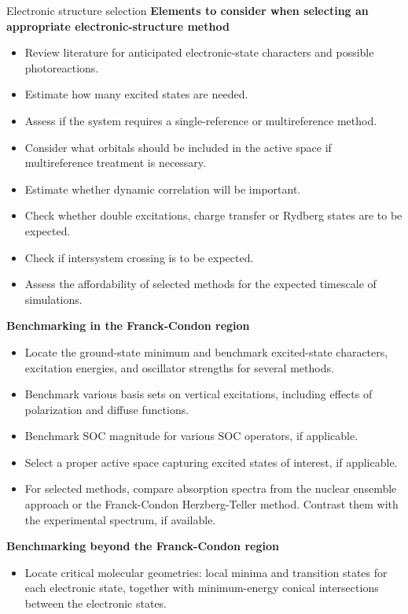 \documentclass[9pt,bestpractices]{livecoms}
\begin{document}
\begin{Checklists*}[p!]

\begin{checklist}{Electronic structure selection}
\textbf{Elements to consider when selecting an appropriate electronic-structure method}
\begin{itemize}
\item Review literature for anticipated electronic-state characters and possible photoreactions.
\item Estimate how many excited states are needed.
\item Assess if the system requires a single-reference or multireference method.
\item Consider what orbitals should be included in the active space if multireference treatment is necessary. 
\item Estimate whether dynamic correlation will be important.
\item Check whether double excitations, charge transfer or Rydberg states are to be expected.
\item Check if intersystem crossing is to be expected.
\item Assess the affordability of selected methods for the expected timescale of simulations.
\end{itemize}
\textbf{Benchmarking in the Franck-Condon region}
\begin{itemize}
\item Locate the ground-state minimum and benchmark excited-state characters, excitation energies, and oscillator strengths for several methods. 
\item Benchmark various basis sets on vertical excitations, including effects of polarization and diffuse functions.
\item Benchmark SOC magnitude for various SOC operators, if applicable.
\item Select a proper active space capturing excited states of interest, if applicable.
\item For selected methods, compare absorption spectra from the nuclear ensemble approach or the Franck-Condon Herzberg-Teller method. Contrast them with the experimental spectrum, if available.
\end{itemize}
\textbf{Benchmarking beyond the Franck-Condon region}
\begin{itemize}
\item Locate critical molecular geometries: local minima and transition states for each electronic state, together with minimum-energy conical intersections between the electronic states.

\end{itemize}
\end{checklist}
\end{Checklists*}
\end{document}
